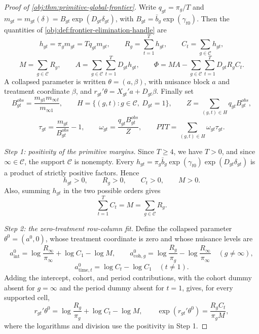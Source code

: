 \begin{proof}[Proof of \cref{obj:thm:primitive-global-frontier}]
Write \(q_{gt}=\pi_g/T\) and
\(m_{gt}=m_{gt}(\delta)=B_{gt}\exp(D_{gt}\delta_{gt})\), with
\(B_{gt}=\bar b_g\exp(\gamma_{t0})\). Then the quantities of
\cref{obj:def:frontier-elimination-handle} are
\[
h_{gt}=\pi_g m_{gt}=Tq_{gt}m_{gt},
\qquad
R_g=\sum_{t=1}^T h_{gt},
\qquad
C_t=\sum_{g\in\mathcal C}h_{gt},
\]
\[
M=\sum_{g\in\mathcal C}R_g,
\qquad
A=\sum_{g\in\mathcal C}\sum_{t=1}^T D_{gt}h_{gt},
\qquad
\Phi=MA-\sum_{g\in\mathcal C}\sum_{t=1}^T D_{gt}R_gC_t .
\]
A collapsed parameter is written \(\theta=(a,\beta)\), with nuisance block \(a\) and treatment coordinate \(\beta\), and
\(r_{gt}'\theta=X_{gt}'a+D_{gt}\beta\). Finally set
\[
B^{obs}_{gt}=\frac{m_{g1}m_{\infty t}}{m_{\infty 1}},
\qquad
H=\{(g,t):g\in\mathcal C,\ D_{gt}=1\},
\qquad
Z=\sum_{(g,t)\in H}q_{gt}B^{obs}_{gt},
\]
\[
\tau_{gt}=\frac{m_{gt}}{B^{obs}_{gt}}-1,
\qquad
\omega_{gt}=\frac{q_{gt}B^{obs}_{gt}}{Z},
\qquad
PTT=\sum_{(g,t)\in H}\omega_{gt}\tau_{gt} .
\]

\textit{Step 1: positivity of the primitive margins.} Since \(T\ge4\), we have \(T>0\), and since \(\infty\in\mathcal C\), the support \(\mathcal C\) is nonempty. Every
\(h_{gt}=\pi_g\bar b_g\exp(\gamma_{t0})\exp(D_{gt}\delta_{gt})\) is a product of strictly positive factors. Hence
\[
h_{gt}>0,
\qquad
R_g>0,
\qquad
C_t>0,
\qquad
M>0 .
\]
Also, summing \(h_{gt}\) in the two possible orders gives
\[
\sum_{t=1}^T C_t=M=\sum_{g\in\mathcal C}R_g .
\]

\textit{Step 2: the zero-treatment row-column fit.} Define the collapsed parameter \(\theta^0=(a^0,0)\), whose treatment coordinate is zero and whose nuisance levels are
\[
a^0_{\mathrm{int}}=\log\frac{R_\infty}{\pi_\infty}+\log C_1-\log M,
\qquad
a^0_{\mathrm{coh},g}=\log\frac{R_g}{\pi_g}-\log\frac{R_\infty}{\pi_\infty}\quad(g\neq\infty),
\]
\[
a^0_{\mathrm{time},t}=\log C_t-\log C_1\quad(t\neq1).
\]
Adding the intercept, cohort, and period contributions, with the cohort dummy absent for \(g=\infty\) and the period dummy absent for \(t=1\), gives, for every supported cell,
\[
r_{gt}'\theta^0=\log\frac{R_g}{\pi_g}+\log C_t-\log M,
\qquad
\exp(r_{gt}'\theta^0)=\frac{R_gC_t}{\pi_g M},
\]
where the logarithms and division use the positivity in Step 1.


\end{proof}
